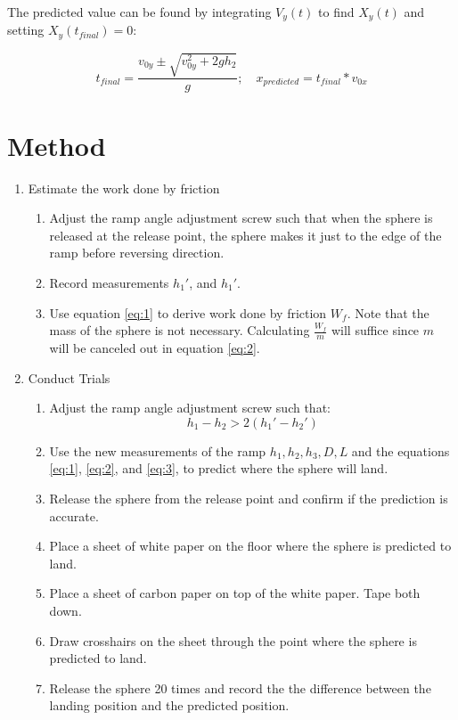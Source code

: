 \documentclass{article}
\begin{document}
The predicted value can be found by integrating $V_{y}(t)$ to find $X_{y}(t)$ and setting $X_{y}(t_{final}) = 0$:


\begin{equation}
    t_{final} = \frac{v_{0y} \pm \sqrt{v_{0y}^2 + 2gh_{2}}}{g}; \quad x_{predicted} = t_{final} * v_{0x}
\end{equation}


\section{Method}
\begin{enumerate}

    \item Estimate the work done by friction 
        \begin{enumerate}
            \item Adjust the ramp angle adjustment screw such that when the sphere is released at the release point, the sphere makes it just to the edge of the ramp before reversing direction.
            \item Record measurements $h_{1}\ensuremath{'}$, and $h_{1}\ensuremath{'}$.
            \item Use equation \eqref{eq:1} to derive work done by friction $W_{f}$. Note that the mass of the sphere is not necessary. Calculating $\frac{W_{f}}{m}$ will suffice since $m$ will be canceled out in equation \eqref{eq:2}.
        \end{enumerate}

    \item Conduct Trials
        \begin{enumerate}
            \item Adjust the ramp angle adjustment screw such that: \\
                \begin{equation} h_{1} - h_{2} > 2(h_{1}\ensuremath{'} - h_{2}\ensuremath{'}) \end{equation}
            \item Use the new measurements of the ramp $h_{1}, h_{2}, h_{3}, D, L$ and the equations \eqref{eq:1}, \eqref{eq:2}, and \eqref{eq:3}, to predict where the sphere will land. 
            \item Release the sphere from the release point and confirm if the prediction is accurate.
            \item Place a sheet of white paper on the floor where the sphere is predicted to land.
            \item Place a sheet of carbon paper on top of the white paper. Tape both down.
            \item Draw crosshairs on the sheet through the point where the sphere is predicted to land.
            \item Release the sphere 20 times and record the the difference between the landing position and the predicted position.


\end{enumerate}
\end{enumerate}
\end{document}
